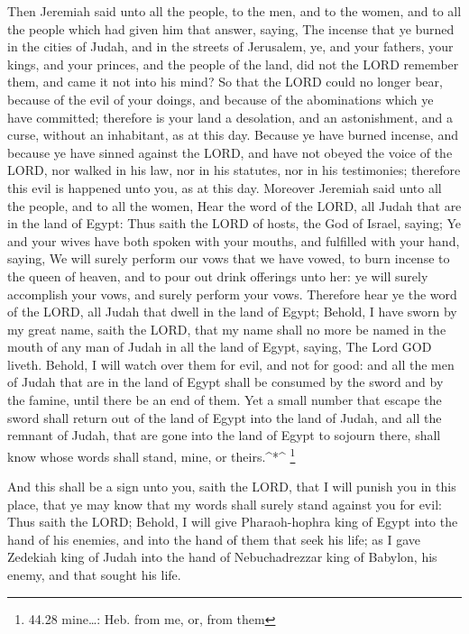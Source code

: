  Then Jeremiah said unto all the people, to the men, and to
the women, and to all the people which had given him that answer,
saying,  The incense that ye burned in the cities of Judah,
and in the streets of Jerusalem, ye, and your fathers, your kings, and
your princes, and the people of the land, did not the LORD remember
them, and came it not into his mind?  So that the LORD
could no longer bear, because of the evil of your doings, and because of
the abominations which ye have committed; therefore is your land a
desolation, and an astonishment, and a curse, without an inhabitant, as
at this day.  Because ye have burned incense, and because
ye have sinned against the LORD, and have not obeyed the voice of the
LORD, nor walked in his law, nor in his statutes, nor in his
testimonies; therefore this evil is happened unto you, as at this day.
 Moreover Jeremiah said unto all the people, and to all the
women, Hear the word of the LORD, all Judah that are in the land of
Egypt:  Thus saith the LORD of hosts, the God of Israel,
saying; Ye and your wives have both spoken with your mouths, and
fulfilled with your hand, saying, We will surely perform our vows that
we have vowed, to burn incense to the queen of heaven, and to pour out
drink offerings unto her: ye will surely accomplish your vows, and
surely perform your vows.  Therefore hear ye the word of
the LORD, all Judah that dwell in the land of Egypt; Behold, I have
sworn by my great name, saith the LORD, that my name shall no more be
named in the mouth of any man of Judah in all the land of Egypt, saying,
The Lord GOD liveth.  Behold, I will watch over them for
evil, and not for good: and all the men of Judah that are in the land of
Egypt shall be consumed by the sword and by the famine, until there be
an end of them.  Yet a small number that escape the sword
shall return out of the land of Egypt into the land of Judah, and all
the remnant of Judah, that are gone into the land of Egypt to sojourn
there, shall know whose words shall stand, mine, or theirs.\^{}*\^{}
\footnote{44.28 mine\ldots: Heb. from me, or, from them}

 And this shall be a sign unto you, saith the LORD, that I
will punish you in this place, that ye may know that my words shall
surely stand against you for evil:  Thus saith the LORD;
Behold, I will give Pharaoh-hophra king of Egypt into the hand of his
enemies, and into the hand of them that seek his life; as I gave
Zedekiah king of Judah into the hand of Nebuchadrezzar king of Babylon,
his enemy, and that sought his life.

